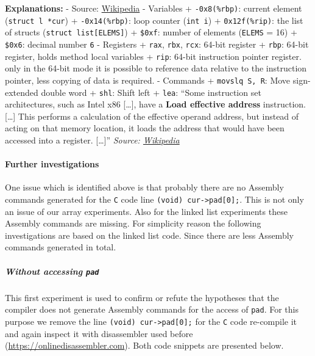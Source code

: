 \textbf{Explanations:} - Source:
\href{https://en.wikipedia.org/wiki/X86_instruction_listings}{Wikipedia}
- Variables + \texttt{-0x8(\%rbp)}: current element
(\texttt{struct\ l\ *cur}) + \texttt{-0x14(\%rbp)}: loop counter
(\texttt{int\ i}) + \texttt{0x12f(\%rip)}: the list of structs
(\texttt{struct\ list{[}ELEMS{]}}) + \texttt{\$0xf}: number of elements
(\texttt{ELEMS} = 16) + \texttt{\$0x6}: decimal number \texttt{6} -
Registers + \texttt{rax}, \texttt{rbx}, \texttt{rcx}: 64-bit register +
\texttt{rbp}: 64-bit register, holds method local variables +
\texttt{rip}: 64-bit instruction pointer register. only in the 64-bit
mode it is possible to reference data relative to the instruction
pointer, less copying of data is required. - Commands +
\texttt{movslq\ S,\ R}: Move sign-extended double word + \texttt{shl}:
Shift left + \texttt{lea}: ``Some instruction set architectures, such as
Intel x86 {[}\ldots{}{]}, have a \textbf{Load effective address}
instruction.{[}\ldots{}{]} This performs a calculation of the effective
operand address, but instead of acting on that memory location, it loads
the address that would have been accessed into a register.
{[}\ldots{}{]}'' \emph{Source:
\href{https://en.wikipedia.org/wiki/Addressing_mode\#Useful_side_effect}{Wikipedia}}

\hypertarget{further-investigations}{\paragraph{Further
investigations}\label{further-investigations}}

One issue which is identified above is that probably there are no
Assembly commands generated for the \texttt{C} code line
\texttt{(void)\ cur-\textgreater{}pad{[}0{]};}. This is not only an
issue of our array experiments. Also for the linked list experiments
these Assembly commands are missing. For simplicity reason the following
investigations are based on the linked list code. Since there are less
Assembly commands generated in total.

\hypertarget{without-accessing-pad}{\subparagraph{\texorpdfstring{Without
accessing
\texttt{pad}}{Without accessing pad}}\label{without-accessing-pad}}

This first experiment is used to confirm or refute the hypotheses that
the compiler does not generate Assembly commands for the access of
\texttt{pad}. For this purpose we remove the line
\texttt{(void)\ cur-\textgreater{}pad{[}0{]};} for the \texttt{C} code
re-compile it and again inspect it with disassembler used before
(\url{https://onlinedisassembler.com}). Both code snippets are presented
below.


